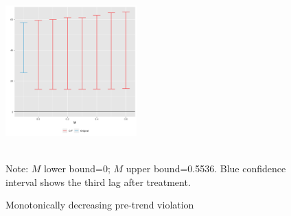 \documentclass{beamer}
\begin{document}
\begin{frame}[label=sensitivity_negative, noframenumbering]
 
\begin{figure}[h]  
\centering
\caption{Monotonically decreasing pre-trend violation}%

\begin{center} 
\end{center} 
\includegraphics[width=0.45\textwidth]{Figures_pres/pretrends_sensitivity_decreasing.png}

       \\  
{\footnotesize Note: $M$ lower bound=0; $M$ upper bound=0.5536. Blue confidence interval shows the third lag after treatment.} 
 \\  
  \hyperlink{robustness}{} 
\end{figure} 
      
\end{frame}
\end{document}
